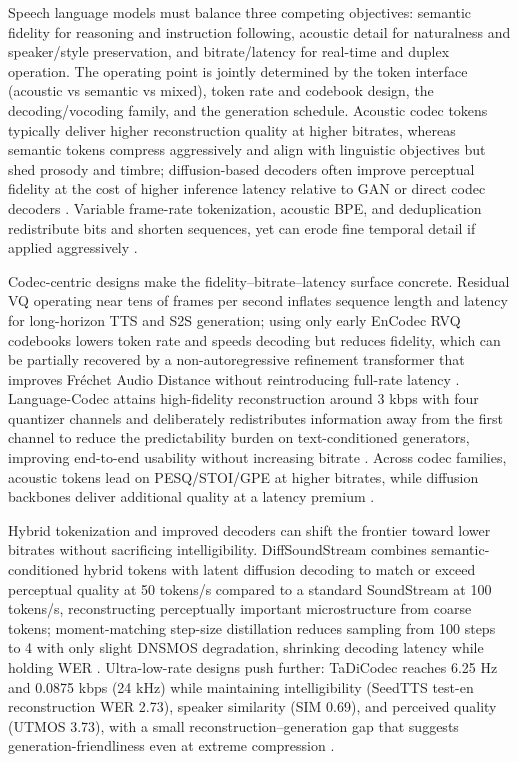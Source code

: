 \documentclass{article}
\begin{document}
Speech language models must balance three competing objectives: semantic fidelity for reasoning and instruction following, acoustic detail for naturalness and speaker/style preservation, and bitrate/latency for real-time and duplex operation. The operating point is jointly determined by the token interface (acoustic vs semantic vs mixed), token rate and codebook design, the decoding/vocoding family, and the generation schedule. Acoustic codec tokens typically deliver higher reconstruction quality at higher bitrates, whereas semantic tokens compress aggressively and align with linguistic objectives but shed prosody and timbre; diffusion-based decoders often improve perceptual fidelity at the cost of higher inference latency relative to GAN or direct codec decoders \cite{guo2025recentadvancesdiscretespeechtokensreview}. Variable frame-rate tokenization, acoustic BPE, and deduplication redistribute bits and shorten sequences, yet can erode fine temporal detail if applied aggressively \cite{guo2025recentadvancesdiscretespeechtokensreview}.



Codec-centric designs make the fidelity--bitrate--latency surface concrete. Residual VQ operating near tens of frames per second inflates sequence length and latency for long-horizon TTS and S2S generation; using only early EnCodec RVQ codebooks lowers token rate and speeds decoding but reduces fidelity, which can be partially recovered by a non-autoregressive refinement transformer that improves Fréchet Audio Distance without reintroducing full-rate latency . Language-Codec attains high-fidelity reconstruction around 3 kbps with four quantizer channels and deliberately redistributes information away from the first channel to reduce the predictability burden on text-conditioned generators, improving end-to-end usability without increasing bitrate \cite{ji2025languagecodecbridgingdiscreterepresentat}. Across codec families, acoustic tokens lead on PESQ/STOI/GPE at higher bitrates, while diffusion backbones deliver additional quality at a latency premium \cite{guo2025recentadvancesdiscretespeechtokensreview}.



Hybrid tokenization and improved decoders can shift the frontier toward lower bitrates without sacrificing intelligibility. DiffSoundStream combines semantic-conditioned hybrid tokens with latent diffusion decoding to match or exceed perceptual quality at 50 tokens/s compared to a standard SoundStream at 100 tokens/s, reconstructing perceptually important microstructure from coarse tokens; moment-matching step-size distillation reduces sampling from 100 steps to 4 with only slight DNSMOS degradation, shrinking decoding latency while holding WER \cite{yang2025diffsoundstreamefficientspeechtokenizati}. Ultra-low-rate designs push further: TaDiCodec reaches 6.25 Hz and 0.0875 kbps (24 kHz) while maintaining intelligibility (SeedTTS test-en reconstruction WER 2.73), speaker similarity (SIM 0.69), and perceived quality (UTMOS 3.73), with a small reconstruction--generation gap that suggests generation-friendliness even at extreme compression \cite{wang2025tadicodectextawarediffusionspeechtokeniz}.
\end{document}
